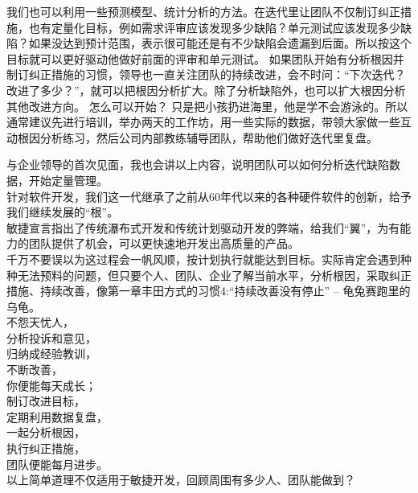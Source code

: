 {\begin{minipage}[t]{0.97\columnwidth}
我们也可以利用一些预测模型、统计分析的方法。在迭代里让团队不仅制订纠正措施，也有定量化目标，例如需求评审应该发现多少缺陷？单元测试应该发现多少缺陷？如果没达到预计范围，表示很可能还是有不少缺陷会遗漏到后面。所以按这个目标就可以更好驱动他做好前面的评审和单元测试。 如果团队开始有分析根因并制订纠正措施的习惯，领导也一直关注团队的持续改进，会不时问：“下次迭代？改进了多少？”，就可以把根因分析扩大。除了分析缺陷外，也可以扩大根因分析其他改进方向。
怎么可以开始？
只是把小孩扔进海里，他是学不会游泳的。所以通常建议先进行培训，举办两天的工作坊，用一些实际的数据，带领大家做一些互动根因分析练习，然后公司内部教练辅导团队，帮助他们做好迭代里复盘。
\strut
\end{minipage}}

与企业领导的首次见面，我也会讲以上内容，说明团队可以如何分析迭代缺陷数据，开始定量管理。\\
针对软件开发，我们这一代继承了之前从60年代以来的各种硬件软件的创新，给予我们继续发展的``根''。\\
敏捷宣言指出了传统瀑布式开发和传统计划驱动开发的弊端，给我们``翼''，为有能力的团队提供了机会，可以更快速地开发出高质量的产品。\\
千万不要误以为这过程会一帆风顺，按计划执行就能达到目标。实际肯定会遇到种种无法预料的问题，但只要个人、团队、企业了解当前水平，分析根因，采取纠正措施、持续改善，像第一章丰田方式的习惯4:“持续改善没有停止”  --  龟兔赛跑里的乌龟。\\
不怨天忧人，\\
分析投诉和意见，\\
归纳成经验教训，\\
不断改善，\\
你便能每天成长；\\
制订改进目标，\\
定期利用数据复盘，\\
一起分析根因，\\
执行纠正措施，\\
团队便能每月进步。\\
以上简单道理不仅适用于敏捷开发，回顾周围有多少人、团队能做到？\\


